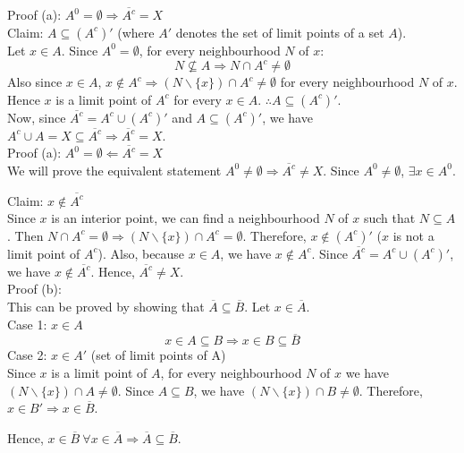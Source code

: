 \documentclass{article}
\begin{document}
	Proof (a): $A^0 = \emptyset \Rightarrow \overline{A^c} = X$ \\
	Claim: $A \subseteq (A^{c})'$ (where $A'$ denotes the set of limit points of a set $A$). \\
	Let $x \in A$.
	Since $A^0 = \emptyset$, for every neighbourhood $N$ of $x$:
	\[ N \nsubseteq A \Rightarrow N \cap A^c \ne \emptyset \]
	Also since $x \in A$, $x \notin A^c \Rightarrow (N \backslash \{x\}) \cap A^c \ne \emptyset$
	for every neighbourhood $N$ of $x$.
	Hence $x$ is a limit point of $A^c$ for every $x \in A$.
	$\therefore A \subseteq (A^{c})'$. \\
	Now, since $\overline{A^c} = A^c \cup (A^c)'$ and $A \subseteq (A^{c})'$, we have
	$A^c \cup A = X \subseteq \overline{A^c} \Rightarrow \overline{A^c} = X$. \\

	Proof (a): $A^0 = \emptyset \Leftarrow \overline{A^c} = X$ \\
	We will prove the equivalent statement $A^0 \ne \emptyset \Rightarrow \overline{A^c} \ne X$.
	Since $A^0 \ne \emptyset$, $\exists x \in A^0$.

	Claim: $x \notin \overline{A^c}$ \\
	Since $x$ is an interior point, we can find a neighbourhood $N$ of $x$ such that $N \subseteq A$.
	Then $N \cap A^c = \emptyset \Rightarrow (N \backslash \{x\}) \cap A^c = \emptyset$.
	Therefore, $x \notin (A^c)'$ ($x$ is not a limit point of $A^c$).
	Also, because $x \in A$, we have $x \notin A^c$.
	Since $\overline{A^c} = A^c \cup (A^c)'$, we have $x \notin \overline{A^c}$.
	Hence, $\overline{A^c} \ne X$. \\

	Proof (b): \\
	This can be proved by showing that $\overline{A} \subseteq \overline{B}$.
	Let $x \in \overline{A}$. \\
	Case 1: $x \in A$ \\
	\[ x \in A \subseteq B \Rightarrow x \in B \subseteq \overline{B} \]
	Case 2: $x \in A'$ (set of limit points of A) \\
	Since $x$ is a limit point of $A$, for every neighbourhood $N$ of $x$ we have $(N \backslash \{x\})
	\cap A \ne \emptyset$.
	Since $A \subseteq B$, we have $(N \backslash \{x\}) \cap B \ne \emptyset$.
	Therefore, $x \in B' \Rightarrow x \in \overline{B}$.

	Hence, $x \in \overline{B} ~ \forall x \in \overline{A} \Rightarrow
	\overline{A} \subseteq \overline{B}$. \\
\end{document}
